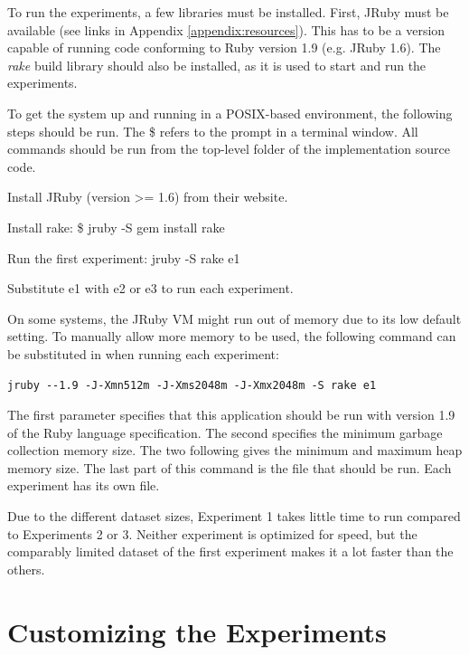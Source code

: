 To run the experiments, a few libraries must be installed. 
First, JRuby must be available (see links in Appendix \ref{appendix:resources}).
This has to be a version capable of running code conforming to Ruby version 1.9 (e.g. JRuby 1.6).
The \emph{rake} build library should also be installed, as it is used to start and run the experiments.

To get the system up and running in a POSIX-based environment, 
the following steps should be run.
The \textsf{\$} refers to the prompt in a terminal window.
All commands should be run from the top-level folder of the implementation source code.

\begin{enumerate*}
  \item Install JRuby (version >= 1.6) from their website.
  \item Install rake: \textsf{\$ jruby -S gem install rake}
  \item Run the first experiment: \textsf{jruby -S rake e1}
  \item Substitute \textsf{e1} with \textsf{e2} or \textsf{e3} to run each experiment.
\end{enumerate*}

On some systems, the JRuby VM might run out of memory due to its low default setting.
To manually allow more memory to be used, the following command
can be substituted in when running each experiment:

{
\footnotesize
\begin{verbatim}
jruby --1.9 -J-Xmn512m -J-Xms2048m -J-Xmx2048m -S rake e1
\end{verbatim}
}

The first parameter specifies that this application should be run with version 1.9 of the Ruby language specification.
The second specifies the minimum garbage collection memory size.
The two following gives the minimum and maximum heap memory size.
The last part of this command is the file that should be run.
Each experiment has its own file.

Due to the different dataset sizes, Experiment 1 takes little time to run
compared to Experiments 2 or 3. 
Neither experiment is optimized for speed, but the comparably
limited dataset of the first experiment makes it a lot 
faster than the others.


\section{Customizing the Experiments}

